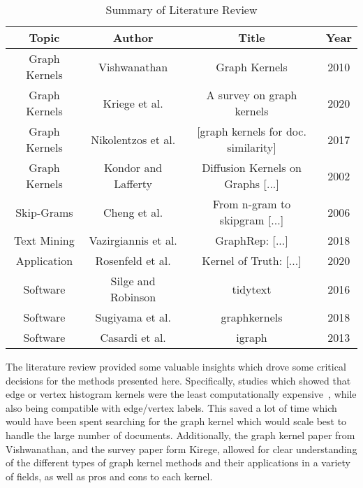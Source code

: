\begin{table}[H]
\caption{Summary of Literature Review}
\centering
\begin{tabular}{ c c c c}
\hline
\hline
Topic & Author & Title & Year \\ [0.5ex]
\hline
Graph Kernels & Vishwanathan & Graph Kernels & 2010\\
Graph Kernels & Kriege et al. & A survey on graph kernels & 2020\\
Graph Kernels & Nikolentzos et al. & [graph kernels for doc. similarity] & 2017\\
Graph Kernels & Kondor and Lafferty &  Diffusion Kernels on Graphs [...] & 2002\\
Skip-Grams & Cheng et al. & From n-gram to skipgram [...] & 2006\\
Text Mining & Vazirgiannis et al. & GraphRep: [...] & 2018 \\
Application & Rosenfeld et al. & Kernel of Truth: [...] & 2020\\
Software & Silge and Robinson& tidytext &  2016\\
Software & Sugiyama et al. & graphkernels & 2018 \\
Software & Casardi et al. & igraph & 2013\\
\hline
\end{tabular}
\end{table}

The literature review provided some valuable insights which drove some critical decisions for the methods presented here. Specifically, studies which showed that edge or vertex histogram kernels were the least computationally expensive~\cite{sugiyama2018graphkernels}, while also being compatible with edge/vertex labels. This saved a lot of time which would have been spent searching for the graph kernel which would scale best to handle the large number of documents. Additionally, the graph kernel paper from Vishwanathan, and the survey paper form Kirege, allowed for clear understanding of the different types of graph kernel methods and their applications in a variety of fields, as well as pros and cons to each kernel.










